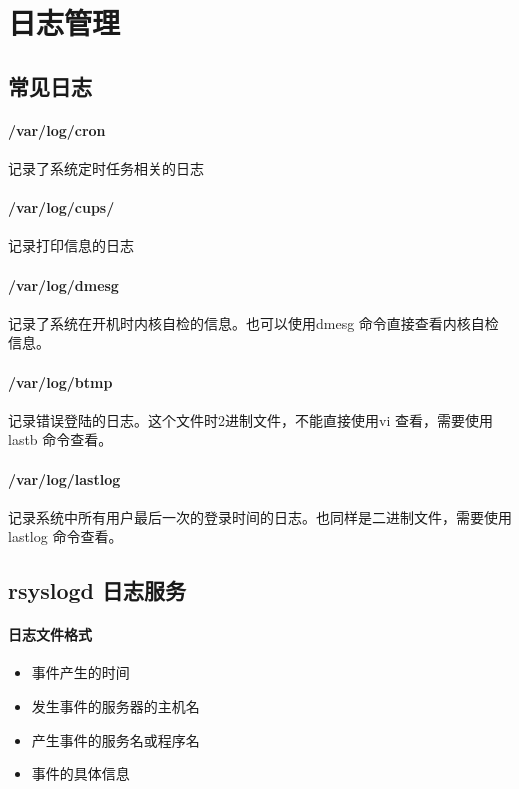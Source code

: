 \documentclass[UTF8,a4paper,12pt]{ctexbook}
\begin{document}
			
	\section{日志管理}
		\subsection{常见日志}
			\paragraph{/var/log/cron}记录了系统定时任务相关的日志
			
			\paragraph{/var/log/cups/}记录打印信息的日志
			
			\paragraph{/var/log/dmesg}记录了系统在开机时内核自检的信息。也可以使用dmesg 命令直接查看内核自检信息。
			
			\paragraph{/var/log/btmp}记录错误登陆的日志。这个文件时2进制文件，不能直接使用vi 查看，需要使用lastb 命令查看。
			
			\paragraph{/var/log/lastlog}记录系统中所有用户最后一次的登录时间的日志。也同样是二进制文件，需要使用lastlog 命令查看。
			
		\subsection{rsyslogd 日志服务}
			\paragraph{日志文件格式}
				\begin{itemize}
					\item 事件产生的时间
					\item 发生事件的服务器的主机名
					\item 产生事件的服务名或程序名
					\item 事件的具体信息
				\end{itemize}
			
\end{document}
